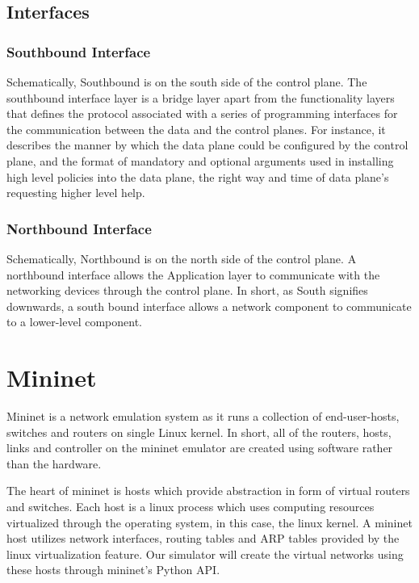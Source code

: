 \documentclass[conference]{IEEEtran}
\begin{document}
    \subsection{Interfaces}

        \subsubsection{Southbound Interface}
            Schematically, Southbound is on the south side of the control plane.
            The southbound interface layer is a bridge layer apart from the functionality layers that defines the protocol associated with a series of programming interfaces for the communication between the data and the control planes. For instance, it describes the manner by which the data plane could be configured by the control plane, and the format of mandatory and optional arguments used in installing high level policies into the data plane, the right way and time of data plane’s requesting higher level help.
        
        \subsubsection{Northbound Interface}  
            Schematically, Northbound is on the north side of the control plane. A northbound interface allows the Application layer to communicate with the networking devices through the control plane.\cite{b2}
            In short, as South signifies downwards, a south bound interface allows a network component to communicate to a lower-level component. \cite{b2}


\section{\textbf{Mininet}}

Mininet is a network emulation system as it runs a collection of end-user-hosts, switches and routers on single Linux kernel. In short, all of the routers, hosts, links and controller on the mininet emulator are created using software rather than the hardware.
\cite{b3}

The heart of mininet is hosts which provide abstraction in form of virtual routers and switches. Each host is a linux process which uses computing resources virtualized through the operating system, in this case, the linux kernel. A mininet host utilizes network interfaces, routing tables and ARP tables provided by the linux virtualization feature. Our simulator will create the virtual networks using these hosts through mininet's Python API.
\end{document}
